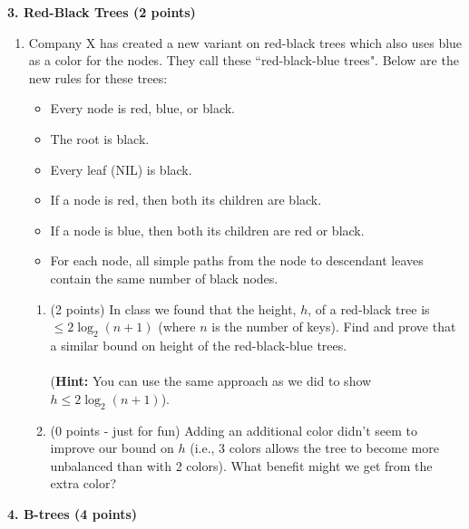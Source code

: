 \documentclass[12pt]{elsart}
\begin{document}
{\bf 3.  Red-Black Trees (2 points)}

\begin{enumerate}
\item Company X has created a new variant on red-black trees which also uses blue as a color for the nodes.  They call these ``red-black-blue trees".  Below are the new rules for these trees:\\

\begin{itemize}
   \item Every node is red, blue, or black.
   \item  The root is black.
   \item Every leaf (NIL) is black.
   \item If a node is red, then both its children are black.
   \item If a node is blue, then both its children are red or black.
   \item For each node, all simple paths from the node to descendant leaves contain the
same number of black nodes.\\
\end{itemize}

\begin{enumerate}
   \item (2 points) In class we found that the height, $h$, of a red-black tree is $\leq 2\log_2(n+1)$ (where $n$ is the number of keys).  Find and prove that a similar bound on height of the red-black-blue trees.
\\\\({\bf Hint:} You can use the same approach as we did to show\\ $h \leq 2\log_2(n+1)$).\\

   \item (0 points - just for fun) Adding an additional color didn't seem to improve our bound on $h$ (i.e., 3 colors allows the tree to become more unbalanced than with 2 colors).    What benefit might we get from the extra color?
\end{enumerate}

\end{enumerate}

{\bf 4.  B-trees (4 points)}
\end{document}
